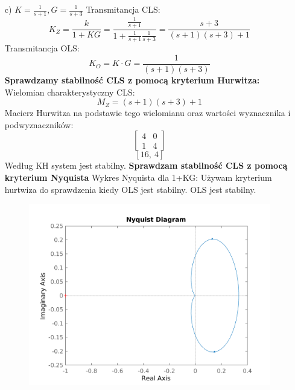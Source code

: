\documentclass{article}
\begin{document}
\begin{itemize}
    \item[c)] $K=\frac{1}{s + 1}, G=\frac{1}{s + 3}$
    Transmitancja CLS:
    $$K_Z=\frac{k}{1+KG}=\frac{\frac{1}{s + 1}}{1+\frac{1}{s + 1}\frac{1}{s + 3}}=\frac{s + 3}{\left(s + 1\right) \left(s + 3\right) + 1}$$
    Transmitancja OLS:
    $$K_O=K\cdot G=\frac{1}{\left(s + 1\right) \left(s + 3\right)}$$
    \textbf{Sprawdzamy stabilność CLS z pomocą kryterium Hurwitza:}\newline
    Wielomian charakterystyczny CLS:
    $$M_Z=\left(s + 1\right) \left(s + 3\right) + 1$$
    Macierz Hurwitza na podstawie tego wielomianu oraz wartości wyznacznika i podwyznaczników:
    $$\left[\begin{matrix}4 & 0\\1 & 4\end{matrix}\right]$$
    $$\left[ 16, \  4\right]$$
    Według KH system jest stabilny.
    \newline\textbf{Sprawdzam stabilność CLS z pomocą kryterium Nyquista}\newline
    Wykres Nyquista dla 1+KG:   
    Używam kryterium hurtwiza do sprawdzenia kiedy OLS jest stabilny. OLS jest stabilny.
    \begin{figure}
        \includegraphics[scale=0.8]{c.png}
        \centering
    \end{figure}
    \newpage            
        

\end{itemize}
\end{document}
